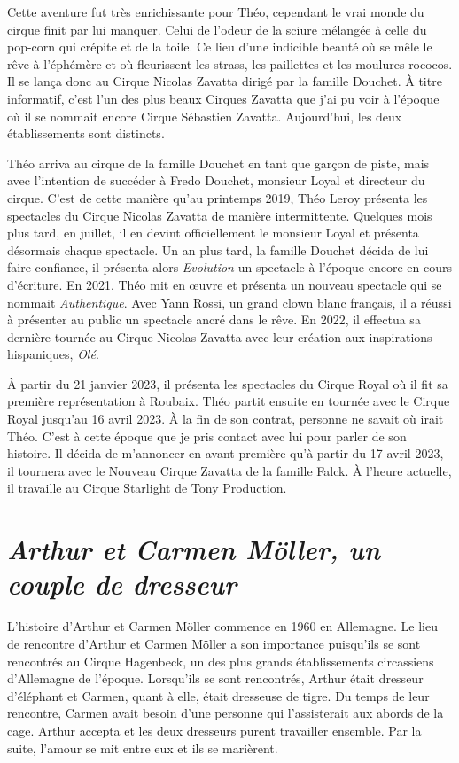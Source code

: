 Cette aventure fut très enrichissante pour Théo, cependant le vrai monde du cirque finit par lui manquer. Celui de l'odeur de la sciure mélangée à celle du pop-corn qui crépite et de la toile. Ce lieu d'une indicible beauté où se mêle le rêve à l'éphémère et où fleurissent les strass, les paillettes et les moulures rococos. Il se lança donc au Cirque Nicolas Zavatta dirigé par la famille Douchet. À titre informatif, c'est l'un des plus beaux Cirques Zavatta que j'ai pu voir à l’époque où il se nommait encore Cirque Sébastien Zavatta. Aujourd'hui, les deux établissements sont distincts.

Théo arriva au cirque de la famille Douchet en tant que garçon de piste, mais avec l'intention de succéder à Fredo Douchet, monsieur Loyal et directeur du cirque. C'est de cette manière qu'au printemps 2019, Théo Leroy présenta les spectacles du Cirque Nicolas Zavatta de manière intermittente. Quelques mois plus tard, en juillet, il en devint officiellement le monsieur Loyal et présenta désormais chaque spectacle. Un an plus tard, la famille Douchet décida de lui faire confiance, il présenta alors \textit{Evolution} un spectacle à l'époque encore en cours d'écriture. En 2021, Théo mit en œuvre et présenta un nouveau spectacle qui se nommait \textit{Authentique}. Avec Yann Rossi, un grand clown blanc français, il a réussi à présenter au public un spectacle ancré dans le rêve. En 2022, il effectua sa dernière tournée au Cirque Nicolas Zavatta avec leur création aux inspirations hispaniques, \textit{Olé}.

À partir du 21 janvier 2023, il présenta les spectacles du Cirque Royal où il fit sa première représentation à Roubaix. Théo partit ensuite en tournée avec le Cirque Royal jusqu'au 16 avril 2023. À la fin de son contrat, personne ne savait où irait Théo. C'est à cette époque que je pris contact avec lui pour parler de son histoire. Il décida de m'annoncer en avant-première qu'à partir du 17 avril 2023, il tournera avec le Nouveau Cirque Zavatta de la famille Falck. À l’heure actuelle, il travaille au Cirque Starlight de Tony Production.

\section*{\textit{Arthur et Carmen Möller, un couple de dresseur  }}
{}
\noindent
L’histoire d’Arthur et Carmen Möller commence en 1960 en Allemagne. Le lieu de rencontre d’Arthur et Carmen Möller a son importance puisqu’ils se sont rencontrés au Cirque Hagenbeck, un des plus grands établissements circassiens d’Allemagne de l’époque. Lorsqu’ils se sont rencontrés, Arthur était dresseur d’éléphant et Carmen, quant à elle, était dresseuse de tigre. Du temps de leur rencontre, Carmen avait besoin d’une personne qui l’assisterait aux abords de la cage. Arthur accepta et les deux dresseurs purent travailler ensemble. Par la suite, l’amour se mit entre eux et ils se marièrent.

